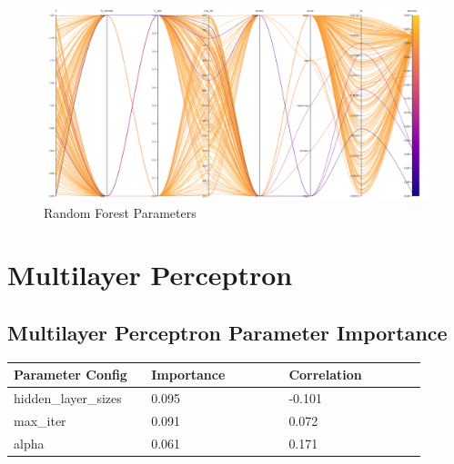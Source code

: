 \documentclass[11pt]{article}
\begin{document}
\begin{appendices}
\begin{figure}[h]
    \caption {Random Forest Parameters} \label{ParallelCoordLC}
    \centering 
    \includegraphics[width = \textwidth, height = \textwidth, keepaspectratio]{Images/LC ParallelCoordGraph.png}
\end{figure}

  \FloatBarrier
\newpage
\section{Multilayer Perceptron}

\subsection{Multilayer Perceptron Parameter Importance}
  \begin{table}[ht]
    \centering
    \begin{tabular}{|p{0.3\linewidth} | p{0.3\linewidth}| p{0.3\linewidth}|} 
      \hline
      \textbf{Parameter Config}  & \textbf{Importance} & \textbf{Correlation} \\ \hline
        hidden\_layer\_sizes & 0.095 & -0.101 \\ \hline
        max\_iter & 0.091 & 0.072 \\ \hline
        alpha & 0.061 & 0.171 \\ \hline
    \end{tabular}
  \end{table}\label{MLP_ParamImp1}


\end{appendices}
\end{document}
